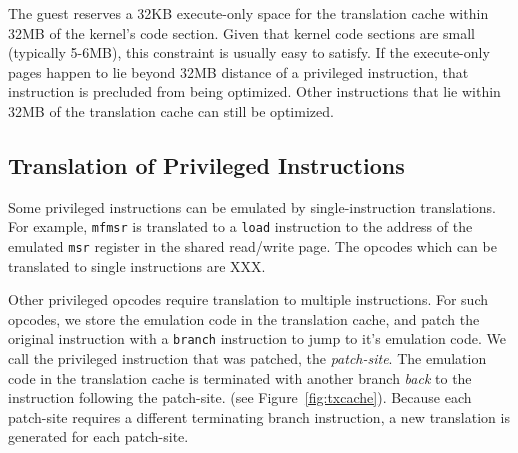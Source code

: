 \documentclass[10pt,twocolumn]{article}
\begin{document}
The guest reserves a 32KB execute-only space for the
translation cache within 32MB of the kernel's code
section. Given that kernel code sections are small (typically 5-6MB),
this constraint is usually easy to satisfy. If the execute-only
pages happen to lie beyond 32MB distance of a privileged instruction, that
instruction is precluded from being optimized. Other instructions that lie
within 32MB of the translation cache can still be optimized.

\subsection{Translation of Privileged Instructions}
Some privileged instructions can
be emulated by single-instruction translations. For example, {\tt mfmsr} is translated
to a {\tt load} instruction to the address of the emulated {\tt msr}
register in the shared read/write page. The opcodes which can be
translated to single instructions are XXX.

Other privileged opcodes require translation to multiple instructions.
For such opcodes, we store the emulation code in the translation cache, and
patch the original instruction with a {\tt branch} instruction to jump to it's
emulation code. We call the privileged instruction
that was patched, the {\em patch-site}. The emulation code in the
translation cache is terminated
with another branch {\em back} to the instruction following the patch-site.
(see Figure~\ref{fig:txcache}). Because each patch-site requires a different
terminating branch instruction, a new translation is generated for
each patch-site.

\end{document}
